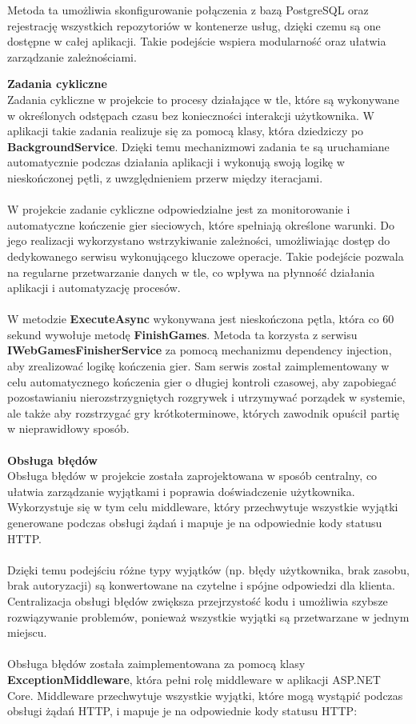 \documentclass[12pt,a4paper]{article}
\begin{document}
\noindent
Metoda ta umożliwia skonfigurowanie połączenia z bazą PostgreSQL oraz rejestrację wszystkich repozytoriów w kontenerze usług, dzięki czemu są one dostępne w całej aplikacji. Takie podejście wspiera modularność oraz ułatwia zarządzanie zależnościami.

\newpage

\noindent \textbf{Zadania cykliczne}\\
Zadania cykliczne w projekcie to procesy działające w tle, które są wykonywane w określonych odstępach czasu bez konieczności interakcji użytkownika. W aplikacji takie zadania realizuje się za pomocą klasy, która dziedziczy po \textbf{BackgroundService}. Dzięki temu mechanizmowi zadania te są uruchamiane automatycznie podczas działania aplikacji i wykonują swoją logikę w nieskończonej pętli, z uwzględnieniem przerw między iteracjami.
\\\\
W projekcie zadanie cykliczne odpowiedzialne jest za monitorowanie i automatyczne kończenie gier sieciowych, które spełniają określone warunki. Do jego realizacji wykorzystano wstrzykiwanie zależności, umożliwiając dostęp do dedykowanego serwisu wykonującego kluczowe operacje. Takie podejście pozwala na regularne przetwarzanie danych w tle, co wpływa na płynność działania aplikacji i automatyzację procesów.
\\\\
W metodzie \textbf{ExecuteAsync} wykonywana jest nieskończona pętla, która co 60 sekund wywołuje metodę \textbf{FinishGames}. Metoda ta korzysta z serwisu \textbf{IWebGamesFinisherService} za pomocą mechanizmu dependency injection, aby zrealizować logikę kończenia gier. Sam serwis został zaimplementowany w celu automatycznego kończenia gier o długiej kontroli czasowej, aby zapobiegać pozostawianiu nierozstrzygniętych rozgrywek i utrzymywać porządek w systemie, ale także aby rozstrzygać gry krótkoterminowe, których zawodnik opuścił partię w nieprawidłowy sposób.
\\\\

\noindent \textbf{Obsługa błędów}\\
Obsługa błędów w projekcie została zaprojektowana w sposób centralny, co ułatwia zarządzanie wyjątkami i poprawia doświadczenie użytkownika. Wykorzystuje się w tym celu middleware, który przechwytuje wszystkie wyjątki generowane podczas obsługi żądań i mapuje je na odpowiednie kody statusu HTTP.
\\\\
Dzięki temu podejściu różne typy wyjątków (np. błędy użytkownika, brak zasobu, brak autoryzacji) są konwertowane na czytelne i spójne odpowiedzi dla klienta. Centralizacja obsługi błędów zwiększa przejrzystość kodu i umożliwia szybsze rozwiązywanie problemów, ponieważ wszystkie wyjątki są przetwarzane w jednym miejscu.
\\\\
Obsługa błędów została zaimplementowana za pomocą klasy \textbf{ExceptionMiddleware}, która pełni rolę middleware w aplikacji ASP.NET Core. Middleware przechwytuje wszystkie wyjątki, które mogą wystąpić podczas obsługi żądań HTTP, i mapuje je na odpowiednie kody statusu HTTP:
\end{document}
